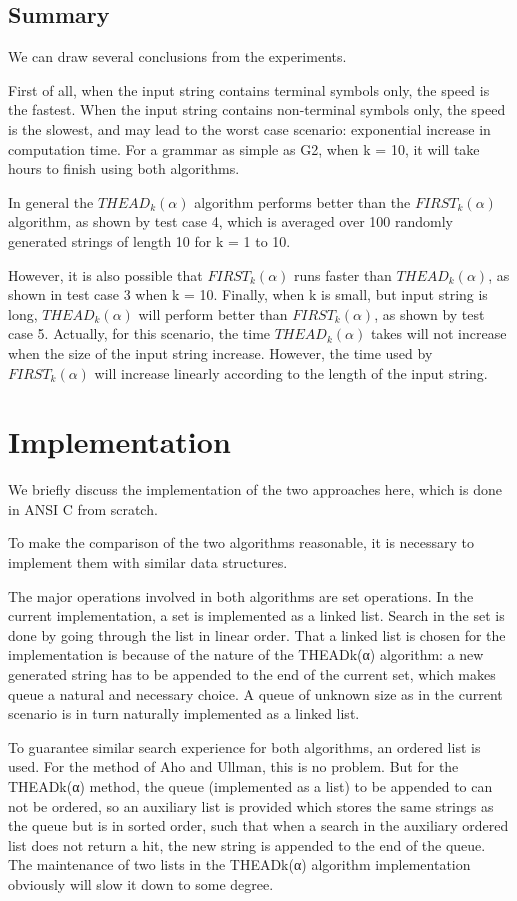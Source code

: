 \documentclass{sig-alternate-05-2015}
\begin{document}
\subsection{Summary}
We can draw several conclusions from the experiments.

First of all, when the input string contains terminal symbols
only, the speed is the fastest. When the input string
contains non-terminal symbols only, the speed is the slowest,
and may lead to the worst case scenario: exponential
increase in computation time. For a grammar as simple as
G2, when k = 10, it will take hours to finish using both
algorithms.

In general the $THEAD_k(\alpha)$ algorithm performs better
than the $FIRST_k(\alpha)$ algorithm, as shown by test case 4,
which is averaged over 100 randomly generated strings of
length 10 for k = 1 to 10.

However, it is also possible that $FIRST_k(\alpha)$ runs faster
than $THEAD_k(\alpha)$, as shown in test case 3 when k = 10.
Finally, when k is small, but input string is long,
$THEAD_k(\alpha)$ will perform better than $FIRST_k(\alpha)$, as shown
by test case 5. Actually, for this scenario, the time
$THEAD_k(\alpha)$ takes will not increase when the size of the
input string increase. However, the time used by $FIRST_k(\alpha)$
will increase linearly according to the length of the input
string.

\section{Implementation}
We briefly discuss the implementation of the two approaches
here, which is done in ANSI C from scratch.

To make the comparison of the two algorithms reasonable,
it is necessary to implement them with similar data
structures.

The major operations involved in both algorithms are set
operations. In the current implementation, a set is implemented
as a linked list. Search in the set is done by going
through the list in linear order. That a linked list is chosen
for the implementation is because of the nature of the
THEADk(α) algorithm: a new generated string has to be
appended to the end of the current set, which makes queue
a natural and necessary choice. A queue of unknown size as
in the current scenario is in turn naturally implemented as a
linked list.

To guarantee similar search experience for both algorithms,
an ordered list is used. For the method of Aho and
Ullman, this is no problem. But for the THEADk(α) method,
the queue (implemented as a list) to be appended to can
not be ordered, so an auxiliary list is provided which stores
the same strings as the queue but is in sorted order, such
that when a search in the auxiliary ordered list does not
return a hit, the new string is appended to the end of the
queue. The maintenance of two lists in the THEADk(α)
algorithm implementation obviously will slow it down to
some degree.
\end{document}
